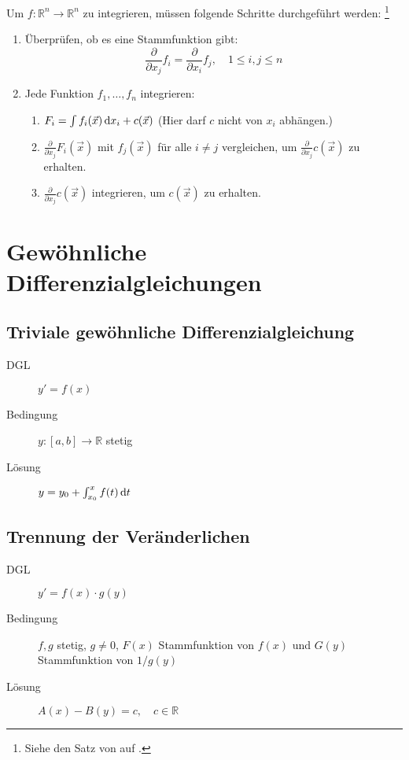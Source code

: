 Um $f : \mathbb{R}^n \to \mathbb{R}^n$ zu integrieren, müssen folgende Schritte durchgeführt werden:%
\footnote{Siehe den Satz von  auf .}
\begin{enumerate}
  \item Überprüfen, ob es eine Stammfunktion gibt:
	\[ \frac{\partial}{\partial x_j} f_i = \frac{\partial}{\partial x_i} f_j, \quad 1 \leq i,j \leq n \]
  \item Jede Funktion $f_1,\ldots,f_n$ integrieren:
	\begin{enumerate}
	  \item $ F_i = \int f_i(\vec x) \,\mathrm{d} x_i + c(\vec x) $ (Hier darf $c$ nicht von $x_i$ abhängen.)
	  \item $\frac{\partial}{\partial x_j} F_i(\vec x)$ mit $f_j(\vec x)$ für alle $i\neq j$ vergleichen, um $\frac{\partial}{\partial x_j} c(\vec x)$ zu erhalten.
	  \item $\frac{\partial}{\partial x_j} c(\vec x)$ integrieren, um $c(\vec x)$ zu erhalten.
	\end{enumerate}
\end{enumerate}





\chapter{Gewöhnliche Differenzialgleichungen}

\section{Triviale gewöhnliche Differenzialgleichung}
\begin{description}
    \item[DGL] $y' = f(x)$
    \item[Bedingung] $y : [a,b] \to \mathbb R$ stetig
    \item[Lösung] $y = y_0 + \int_{x_0}^x f(t) \,\mathrm{d} t$
\end{description}

\section{Trennung der Veränderlichen}
\begin{description}
    \item[DGL] $y' = f(x) \cdot g(y)$
    \item[Bedingung] $f,g$ stetig, $g \neq 0$, $F(x)$ Stammfunktion von $f(x)$ und $G(y)$ Stammfunktion von $1/g(y)$
    \item[Lösung] $A(x) - B(y) = c, \quad c \in \mathbb R$
\end{description}

